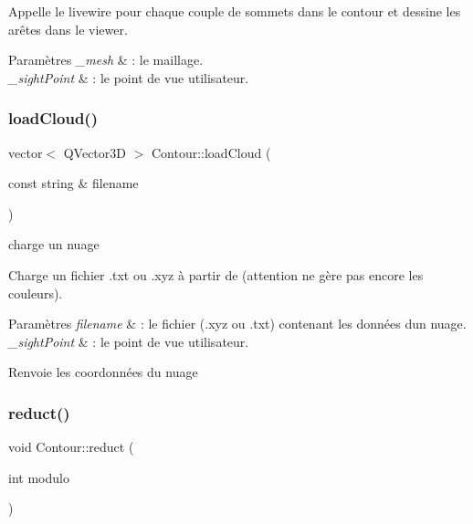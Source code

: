 Appelle le livewire pour chaque couple de sommets dans le contour et dessine les arêtes dans le viewer.


\begin{DoxyParams}{Paramètres}
{\em \+\_\+mesh} & \+: le maillage. \\
\hline
{\em \+\_\+sight\+Point} & \+: le point de vue utilisateur. \\
\hline
\end{DoxyParams}
\mbox{\label{classContour_a8e7d2f787365f5b4e03c3d7173f2c3e9}} 
\subsubsection{\texorpdfstring{load\+Cloud()}{loadCloud()}}
{\footnotesize\ttfamily vector$<$ Q\+Vector3D $>$ Contour\+::load\+Cloud (\begin{DoxyParamCaption}\item[{const string \&}]{filename }\end{DoxyParamCaption})\hspace{0.3cm}{\ttfamily [protected]}}



charge un nuage 

Charge un fichier .txt ou .xyz à partir de  (attention ne gère pas encore les couleurs).


\begin{DoxyParams}{Paramètres}
{\em filename} & \+: le fichier (.xyz ou .txt) contenant les données d\textquotesingle{}un nuage. \\
\hline
{\em \+\_\+sight\+Point} & \+: le point de vue utilisateur.\\
\hline
\end{DoxyParams}
\begin{DoxyReturn}{Renvoie}
les coordonnées du nuage 
\end{DoxyReturn}
\mbox{\label{classContour_a82c764d0bacfbdaea423679ce7a43661}} 
\subsubsection{\texorpdfstring{reduct()}{reduct()}}
{\footnotesize\ttfamily void Contour\+::reduct (\begin{DoxyParamCaption}\item[{int}]{modulo }\end{DoxyParamCaption})}




